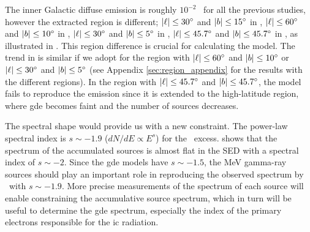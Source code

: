 \documentclass[a4paper,11pt]{article}
\begin{document}
The inner Galactic diffuse emission is roughly $10^{-2}$ \Mflux\ for all the previous studies,
however the extracted region is different;
$|\ell| \leq 30\hbox{$^\circ$}$ and $|b| \leq 15\hbox{$^\circ$}$ in \cite{bouchet_diffuse_2011}, $|\ell| \leq 60\hbox{$^\circ$}$ and $|b| \leq 10\hbox{$^\circ$}$ in \cite{strong_diffuse_2004}, $|\ell| \leq 30\hbox{$^\circ$}$ and $|b| \leq 5\hbox{$^\circ$}$ in \cite{strong_comptel_1999}, $|\ell| \leq 45.7\hbox{$^\circ$}$ and $|b| \leq 45.7\hbox{$^\circ$}$ in \cite{siegert_diffuse_2022}, as illustrated in .
This region difference is crucial for calculating the model.
The trend in  is similar if we adopt for the region with  $|\ell| \leq 60\hbox{$^\circ$}$ and $|b| \leq 10\hbox{$^\circ$}$ or  $|\ell| \leq 30\hbox{$^\circ$}$ and $|b| \leq 5\hbox{$^\circ$}$ (see Appendix \ref{sec:region_appendix} for the results with the different regions).
In the region with $|\ell| \leq 45.7\hbox{$^\circ$}$ and $|b| \leq 45.7\hbox{$^\circ$}$, the model fails to reproduce the emission since it is extended to the high-latitude region, where \ac{gde} becomes faint and the number of sources decreases.
\fi


The spectral shape would provide us with a new constraint.
The power-law spectral index is $s \sim -1.9$ ($dN/dE \propto E^s$) for the \comptel\ excess.
 shows that the spectrum of the accumulated sources is almost flat in the SED with a spectral index of $s \sim -2$.
Since the \ac{gde} models have $s \sim -1.5$, the MeV gamma-ray sources should play an important role in reproducing the observed spectrum by \comptel\ with $s \sim -1.9$.
More precise measurements of the spectrum of each source will enable constraining the accumulative source spectrum, which in turn will be useful to determine the \ac{gde} spectrum, especially the index of the primary electrons responsible for the \ac{ic} radiation.
\end{document}

